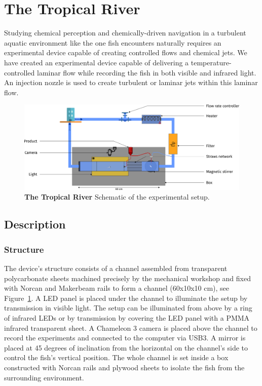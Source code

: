   \section{The Tropical River}
  Studying chemical perception and chemically-driven navigation in a turbulent aquatic environment like the one fish encounters naturally requires an experimental device capable of creating controlled flows and chemical jets. We have created an experimental device capable of delivering a temperature-controlled laminar flow while recording the fish in both visible and infrared light. An injection nozzle is used to create turbulent or laminar jets within this laminar flow.

    \begin{figure}[h]
      \centering
      \includegraphics[width=1\textwidth]{part_2/assets/river.png}
      \caption{\textbf{The Tropical River} Schematic of the experimental setup.}
      \label{river}
    \end{figure}

\subsection{Description}
  \subsubsection{Structure}
  The device's structure consists of a channel assembled from transparent polycarbonate sheets machined precisely by the mechanical workshop and fixed with Norcan and Makerbeam rails to form a channel (60x10x10 cm), see Figure~\ref{river}. A LED panel is placed under the channel to illuminate the setup by transmission in visible light. The setup can be illuminated from above by a ring of infrared LEDs or by transmission by covering the LED panel with a PMMA infrared transparent sheet. A Chameleon 3 camera is placed above the channel to record the experiments and connected to the computer via USB3. A mirror is placed at 45 degrees of inclination from the horizontal on the channel's side to control the fish's vertical position. The whole channel is set inside a box constructed with Norcan rails and plywood sheets to isolate the fish from the surrounding environment.

